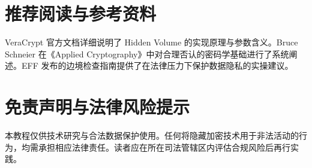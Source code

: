 \section{推荐阅读与参考资料}
VeraCrypt 官方文档详细说明了 Hidden Volume 的实现原理与参数含义。Bruce Schneier 在《Applied Cryptography》中对合理否认的密码学基础进行了系统阐述。EFF 发布的边境检查指南提供了在法律压力下保护数据隐私的实操建议。\par
\section{免责声明与法律风险提示}
本教程仅供技术研究与合法数据保护使用。任何将隐藏加密技术用于非法活动的行为，均需承担相应法律责任。读者应在所在司法管辖区内评估合规风险后再行实践。\par
